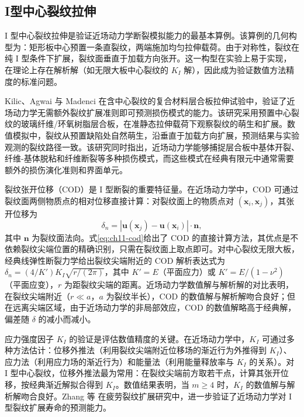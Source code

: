 \subsection{I型中心裂纹拉伸}\label{sec:ch11-mode-i}

I 型中心裂纹拉伸是验证近场动力学断裂模拟能力的最基本算例。该算例的几何构型为：矩形板中心预置一条直裂纹，两端施加均匀拉伸载荷。由于对称性，裂纹在纯 I 型条件下扩展，裂纹面垂直于加载方向张开。这一构型在实验上易于实现，在理论上存在解析解（如无限大板中心裂纹的 $K_I$ 解），因此成为验证数值方法精度的标准问题。

Kilic、Agwai 与 Madenci \cite{KilicAgwaiMadenci2009} 在含中心裂纹的复合材料层合板拉伸试验中，验证了近场动力学无需额外裂纹扩展准则即可预测损伤模式的能力。该研究采用预置中心裂纹的玻璃纤维/环氧树脂层合板，在准静态拉伸载荷下观察裂纹的萌生和扩展。数值模拟中，裂纹从预置缺陷处自然萌生，沿垂直于加载方向扩展，预测结果与实验观测的裂纹路径一致。该研究同时指出，近场动力学能够捕捉层合板中基体开裂、纤维-基体脱粘和纤维断裂等多种损伤模式，而这些模式在经典有限元中通常需要额外的损伤演化准则和界面单元。

裂纹张开位移（COD）是 I 型断裂的重要特征量。在近场动力学中，COD 可通过裂纹面两侧物质点的相对位移直接计算：对裂纹面上的物质点对 $(\mathbf{x}_i, \mathbf{x}_j)$，其张开位移为
\begin{equation}
\delta_n=|\mathbf{u}(\mathbf{x}_j)-\mathbf{u}(\mathbf{x}_i)|\cdot\mathbf{n},
\label{eq:ch11-cod}
\end{equation}
其中 $\mathbf{n}$ 为裂纹面法向。式\eqref{eq:ch11-cod}给出了 COD 的直接计算方法，其优点是不依赖裂纹尖端位置的精确识别，只需在裂纹面上取点即可。对中心裂纹无限大板，经典线弹性断裂力学给出裂纹尖端附近的 COD 解析表达式为 $\delta_n=(4/K')K_I\sqrt{r/(2\pi)}$，其中 $K'=E$（平面应力）或 $K'=E/(1-\nu^2)$（平面应变），$r$ 为距裂纹尖端的距离。近场动力学数值解与解析解的对比表明，在裂纹尖端附近（$r\ll a$，$a$ 为裂纹半长），COD 的数值解与解析解吻合良好；但在远离尖端区域，由于近场动力学的非局部效应，COD 的数值解略高于经典解，偏差随 $\delta$ 的减小而减小。

应力强度因子 $K_I$ 的验证是评估数值精度的关键。在近场动力学中，$K_I$ 可通过多种方法估计：位移外推法（利用裂纹尖端附近位移场的渐近行为外推得到 $K_I$）、应力法（利用应力场的渐近行为）和能量法（利用能量释放率与 $K_I$ 的关系）。对 I 型中心裂纹，位移外推法最为常用：在裂纹尖端前方取若干点，计算其张开位移，按经典渐近解拟合得到 $K_I$。数值结果表明，当 $m\geq 4$ 时，$K_I$ 的数值解与解析解吻合良好。Zhang 等 \cite{Zhang2016Fatigue} 在疲劳裂纹扩展研究中，进一步验证了近场动力学对 I 型裂纹扩展寿命的预测能力。

